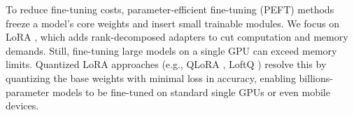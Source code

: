 To reduce fine-tuning costs, parameter-efficient fine-tuning (PEFT) methods \cite{zaken2021bitfit,hu2021lora,mao2021unipelt,liu2022few} freeze a model’s core weights and insert small trainable modules. We focus on LoRA \cite{hu2021lora}, which adds rank-decomposed adapters to cut computation and memory demands. Still, fine-tuning large models on a single GPU can exceed memory limits. Quantized LoRA approaches (e.g., QLoRA \cite{dettmers2024qlora}, LoftQ \cite{li2023loftq}) resolve this by quantizing the base weights with minimal loss in accuracy, enabling billions-parameter models to be fine-tuned on standard single GPUs or even mobile devices.





